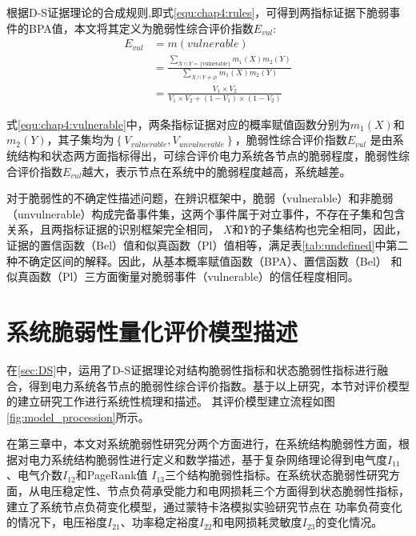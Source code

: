根据D-S证据理论的合成规则,即式\ref{equ:chap4:rules}，可得到两指标证据下脆弱事件的BPA值，本文将其定义为脆弱性综合评价指数$E_{vul}$:
\begin{equation}
\label{equ:chap4:vulnerable}
\begin{aligned} E_{vul} &=m(vulnerable) \\ 
 &=\frac{\sum_{X \cap Y=\{\text {vulnerable}\}} m_{1}(X) m_{2}(Y)}{\sum_{X \cap Y \neq \varnothing} m_{1}(X) m_{2}(Y)} \\
 &=\frac{V_{1} \times V_{2}}{V_{1} \times V_{2}+\left(1-V_{1}\right) \times\left(1-V_{2}\right)} \end{aligned}
\end{equation}

式\ref{equ:chap4:vulnerable}中，两条指标证据对应的概率赋值函数分别为$m_1(X)$和$m_2(Y)$，其子集均为$\left\{V_{vulnerable},V_{unvulnerable} \right\}$，脆弱性综合评价指数$E_{vul}$
是由系统结构和状态两方面指标得出，可综合评价电力系统各节点的脆弱程度，脆弱性综合评价指数$E_{vul}$越大，表示节点在系统中的脆弱程度越高，系统越差。

对于脆弱性的不确定性描述问题，在辨识框架中，脆弱（vulnerable）和非脆弱（unvulnerable）构成完备事件集，这两个事件属于对立事件，不存在子集和包含关系，且两指标证据的识别框架完全相同，
$X$和$Y$的子集结构也完全相同，因此，证据的置信函数（Bel）值和似真函数（Pl）值相等，满足表\ref{tab:undefined}中第二种不确定区间的解释。因此，从基本概率赋值函数（BPA）、置信函数（Bel）
和似真函数（Pl）三方面衡量对脆弱事件（vulnerable）的信任程度相同。

\section{系统脆弱性量化评价模型描述}
\label{sec:systemQuan}
在\ref{sec:DS}中，运用了D-S证据理论对结构脆弱性指标和状态脆弱性指标进行融合，得到电力系统各节点的脆弱性综合评价指数。基于以上研究，本节对评价模型的建立研究工作进行系统性梳理和描述。
其评价模型建立流程如图\ref{fig:model_procession}所示。

在第三章中，本文对系统脆弱性研究分两个方面进行，在系统结构脆弱性方面，根据对电力系统结构脆弱性进行定义和数学描述，基于复杂网络理论得到电气度$I_{11}$、电气介数$I_{12}$和PageRank值
$I_{13}$三个结构脆弱性指标。在系统状态脆弱性研究方面，从电压稳定性、节点负荷承受能力和电网损耗三个方面得到状态脆弱性指标，建立了系统节点负荷变化模型，通过蒙特卡洛模拟实验研究节点在
功率负荷变化的情况下，电压裕度$I_{21}$、功率稳定裕度$I_{22}$和电网损耗灵敏度$I_{23}$的变化情况。

